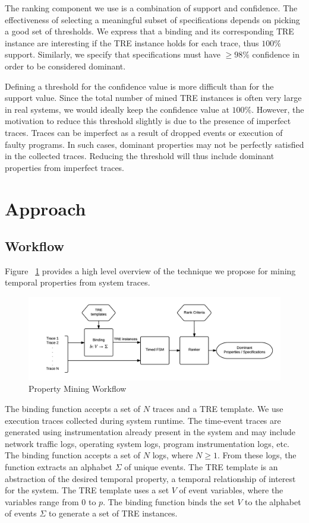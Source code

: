 \documentclass[]{sigplanconf}
\begin{document}
The ranking component we use is a combination of support and confidence. The effectiveness of selecting a meaningful subset of specifications depends on picking a good set of thresholds. We express that a binding and its corresponding TRE instance are interesting if the TRE instance holds for each trace, thus $100 \%$ support. Similarly, we specify that specifications must have $ \ge 98 \%$ confidence in order to be considered dominant.

Defining a threshold for the confidence value is more difficult than for the support value. Since the total number of mined TRE instances is often very large in real systems, we would ideally keep the confidence value at $100 \%$. However, the motivation to reduce this threshold slightly is due to the presence of imperfect traces. Traces can be imperfect as a result of dropped events or execution of faulty programs. In such cases, dominant properties may not be perfectly satisfied in the collected traces. Reducing the threshold will thus include dominant properties from imperfect traces.


\section{Approach} \label{Approach}

\subsection{Workflow}

Figure ~\ref{fig:approach} provides a high level overview of the technique we propose for mining temporal properties from system traces.

\begin{figure}[h]
  \centering
  \includegraphics[trim = 1cm 0cm 0cm 0cm,clip = true,width=\linewidth]{figures/Workflow.png}
  \caption{Property Mining Workflow}
  \label{fig:approach}
\end{figure}

The binding function accepts a set of $N$ traces and a TRE template. We use execution traces collected during system runtime. The time-event traces are generated using instrumentation already present in the system and may include network traffic logs, operating system logs, program instrumentation logs, etc. The binding function accepts a set of $N$ logs, where $N \ge 1$. From these logs, the function extracts an alphabet $\Sigma$ of unique events. The TRE template is an abstraction of the desired temporal property, a temporal relationship of interest for the system. The TRE template uses a set $V$ of event variables, where the variables range from $0$ to $p$. The binding function binds the set $V$ to the alphabet of events $\Sigma$ to generate a set of TRE instances.
\end{document}
